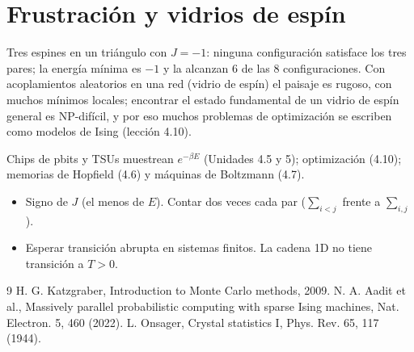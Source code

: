 \documentclass[11pt,a4paper]{article}
\begin{document}
\section{Frustración y vidrios de espín}
Tres espines en un triángulo con $J=-1$: ninguna configuración satisface los tres pares; la energía mínima es $-1$ y la alcanzan 6 de las 8
configuraciones. Con acoplamientos aleatorios en una red (vidrio de espín) el paisaje es rugoso, con muchos mínimos locales; encontrar el estado
fundamental de un vidrio de espín general es NP-difícil, y por eso muchos problemas de optimización se escriben como modelos de Ising (lección 4.10).

\begin{aplicacion}
Chips de pbits y TSUs muestrean $e^{-\beta E}$ (Unidades 4.5 y 5); optimización (4.10); memorias de Hopfield (4.6) y máquinas de Boltzmann (4.7).
\end{aplicacion}

\begin{error}
\begin{itemize}[nosep]
\item Signo de $J$ (el menos de $E$). \quad Contar dos veces cada par ($\sum_{i<j}$ frente a $\sum_{i,j}$).
\item Esperar transición abrupta en sistemas finitos. \quad La cadena 1D no tiene transición a $T>0$.
\end{itemize}
\end{error}

\begin{thebibliography}{9}\small
{} H. G. Katzgraber, Introduction to Monte Carlo methods, 2009.
 N. A. Aadit et al., Massively parallel probabilistic computing with sparse Ising machines, Nat. Electron. 5, 460 (2022).
 L. Onsager, Crystal statistics I, Phys. Rev. 65, 117 (1944).
\end{thebibliography}
\end{document}
